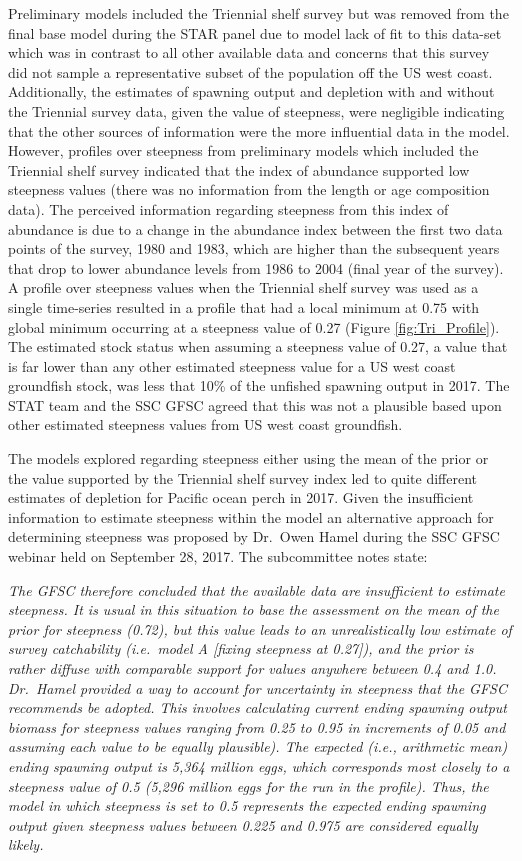 \documentclass[12pt,]{article}
\begin{document}
Preliminary models included the Triennial shelf survey but was removed
from the final base model during the STAR panel due to model lack of fit
to this data-set which was in contrast to all other available data and
concerns that this survey did not sample a representative subset of the
population off the US west coast. Additionally, the estimates of
spawning output and depletion with and without the Triennial survey
data, given the value of steepness, were negligible indicating that the
other sources of information were the more influential data in the
model. However, profiles over steepness from preliminary models which
included the Triennial shelf survey indicated that the index of
abundance supported low steepness values (there was no information from
the length or age composition data). The perceived information regarding
steepness from this index of abundance is due to a change in the
abundance index between the first two data points of the survey, 1980
and 1983, which are higher than the subsequent years that drop to lower
abundance levels from 1986 to 2004 (final year of the survey). A profile
over steepness values when the Triennial shelf survey was used as a
single time-series resulted in a profile that had a local minimum at
0.75 with global minimum occurring at a steepness value of 0.27 (Figure
\ref{fig:Tri_Profile}). The estimated stock status when assuming a
steepness value of 0.27, a value that is far lower than any other
estimated steepness value for a US west coast groundfish stock, was less
that 10\% of the unfished spawning output in 2017. The STAT team and the
SSC GFSC agreed that this was not a plausible based upon other estimated
steepness values from US west coast groundfish.

The models explored regarding steepness either using the mean of the
prior or the value supported by the Triennial shelf survey index led to
quite different estimates of depletion for Pacific ocean perch in 2017.
Given the insufficient information to estimate steepness within the
model an alternative approach for determining steepness was proposed by
Dr.~Owen Hamel during the SSC GFSC webinar held on September 28, 2017.
The subcommittee notes state:

\emph{The GFSC therefore concluded that the available data are
insufficient to estimate steepness. It is usual in this situation to
base the assessment on the mean of the prior for steepness (0.72), but
this value leads to an unrealistically low estimate of survey
catchability (i.e.~model A {[}fixing steepness at 0.27{]}), and the
prior is rather diffuse with comparable support for values anywhere
between 0.4 and 1.0. Dr.~Hamel provided a way to account for uncertainty
in steepness that the GFSC recommends be adopted. This involves
calculating current ending spawning output biomass for steepness values
ranging from 0.25 to 0.95 in increments of 0.05 and assuming each value
to be equally plausible). The expected (i.e., arithmetic mean) ending
spawning output is 5,364 million eggs, which corresponds most closely to
a steepness value of 0.5 (5,296 million eggs for the run in the
profile). Thus, the model in which steepness is set to 0.5 represents
the expected ending spawning output given steepness values between 0.225
and 0.975 are considered equally likely.}
\end{document}
